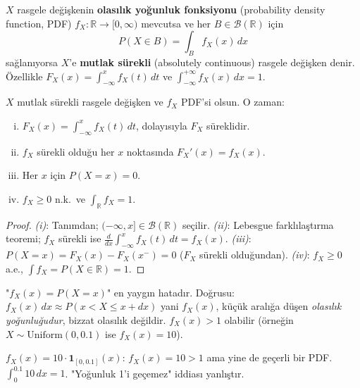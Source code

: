 \begin{tanim}
\label{def:surekli_rd}
$X$ rasgele değişkenin \textbf{olasılık yoğunluk fonksiyonu} (probability density function, PDF)
$f_X : \mathbb{R} \to [0, \infty)$ mevcutsa ve her $B \in \mathcal{B}(\mathbb{R})$ için
\[
  P(X \in B) = \int_B f_X(x) \, dx
\]
sağlanıyorsa $X$'e \textbf{mutlak sürekli} (absolutely continuous) rasgele değişken denir.
Özellikle $F_X(x) = \int_{-\infty}^x f_X(t) \, dt$ ve $\int_{-\infty}^{+\infty} f_X(x) \, dx = 1$.
\end{tanim}

\begin{teorem}
\label{thm:pdf_kdf}
$X$ mutlak sürekli rasgele değişken ve $f_X$ PDF'si olsun. O zaman:
\begin{enumerate}[(i)]
  \item $F_X(x) = \int_{-\infty}^x f_X(t) \, dt$, dolayısıyla $F_X$ süreklidir.
  \item $f_X$ sürekli olduğu her $x$ noktasında $F_X'(x) = f_X(x)$.
  \item Her $x$ için $P(X = x) = 0$.
  \item $f_X \geq 0$ n.k.\ ve $\int_{\mathbb{R}} f_X = 1$.
\end{enumerate}
\end{teorem}

\begin{proof}
\textit{(i)}: Tanımdan; $(-\infty, x] \in \mathcal{B}(\mathbb{R})$ seçilir.
\textit{(ii)}: Lebesgue farklılaştırma teoremi; $f_X$ sürekli ise
$\frac{d}{dx} \int_{-\infty}^x f_X(t) \, dt = f_X(x)$.
\textit{(iii)}: $P(X = x) = F_X(x) - F_X(x^-) = 0$ ($F_X$ sürekli olduğundan).
\textit{(iv)}: $f_X \geq 0$ a.e., $\int f_X = P(X \in \mathbb{R}) = 1$.
\end{proof}

\begin{hataanalizi}
"$f_X(x) = P(X = x)$" en yaygın hatadır. Doğrusu: $f_X(x) \, dx \approx P(x < X \leq x + dx)$
yani $f_X(x)$, küçük aralığa düşen \emph{olasılık yoğunluğudur}, bizzat olasılık değildir.
$f_X(x) > 1$ olabilir (örneğin $X \sim \mathrm{Uniform}(0, 0.1)$ ise $f_X(x) = 10$).
\end{hataanalizi}

\begin{karsiornek}
$f_X(x) = 10 \cdot \mathbf{1}_{[0, 0.1]}(x)$: $f_X(x) = 10 > 1$ ama yine de geçerli bir PDF.
$\int_0^{0.1} 10 \, dx = 1$. "Yoğunluk 1'i geçemez" iddiası yanlıştır.
\end{karsiornek}

